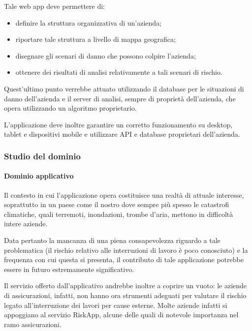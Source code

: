 		Tale web app deve permettere di:
		\begin{itemize}
			\item definire la struttura organizzativa di un'azienda;
			\item riportare tale struttura a livello di mappa geografica;
			\item disegnare gli scenari di danno che possono colpire l'azienda;
			\item ottenere dei risultati di analisi relativamente a tali scenari di rischio.
		\end{itemize}
		Quest'ultimo punto verrebbe attuato utilizzando il database per le situazioni di danno dell'azienda e il server di analisi, sempre di proprietà dell'azienda,
		che opera utilizzando un algoritmo proprietario.

		L'applicazione deve inoltre garantire un corretto funzionamento su desktop, tablet e dispositivi mobile e utilizzare API e database proprietari dell'azienda.
		\subsubsection{Studio del dominio}
			\paragraph{Dominio applicativo}
			Il contesto in cui l'applicazione opera costituisce una realtà di attuale interesse, soprattutto in un paese come il nostro dove sempre più spesso le catastrofi climatiche, quali terremoti, inondazioni, trombe d'aria, mettono in difficoltà intere aziende.

			Data pertanto la mancanza di una piena consapevolezza riguardo a tale problematica (il rischio relativo alle interruzioni di lavoro è poco conosciuto) e la frequenza con cui questa si presenta, il contributo di tale applicazione potrebbe essere in futuro estremamente significativo.

			Il servizio offerto dall'applicativo andrebbe inoltre a coprire un vuoto: le aziende di assicurazioni, infatti, non hanno ora strumenti adeguati per valutare il rischio legato all'interruzione dei lavori per cause esterne. Molte aziende infatti si appoggiano al servizio RiskApp, alcune delle quali di notevole importanza nel ramo assicurazioni.
